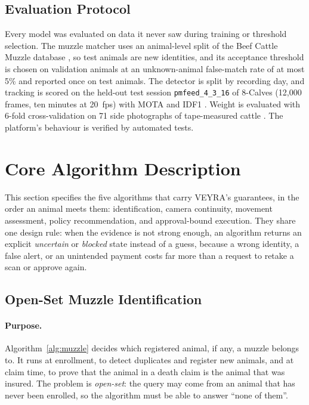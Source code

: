 \documentclass[11pt,letterpaper]{article}
\begin{document}
\subsection{Evaluation Protocol}

Every model was evaluated on data it never saw during training or threshold selection. The muzzle matcher uses an animal-level split of the Beef Cattle Muzzle database \cite{li2022muzzle}, so test animals are new identities, and its acceptance threshold is chosen on validation animals at an unknown-animal false-match rate of at most 5\% and reported once on test animals. The detector is split by recording day, and tracking is scored on the held-out test session \texttt{pmfeed\_4\_3\_16} of 8-Calves (12{,}000 frames, ten minutes at 20~fps) with MOTA \cite{bernardin2008mota} and IDF1 \cite{ristani2016idf1}. Weight is evaluated with 6-fold cross-validation on 71 side photographs of tape-measured cattle \cite{mendeley_r11}. The platform's behaviour is verified by automated tests.

\section{Core Algorithm Description}

This section specifies the five algorithms that carry VEYRA's guarantees, in the order an animal meets them: identification, camera continuity, movement assessment, policy recommendation, and approval-bound execution. They share one design rule: when the evidence is not strong enough, an algorithm returns an explicit \emph{uncertain} or \emph{blocked} state instead of a guess, because a wrong identity, a false alert, or an unintended payment costs far more than a request to retake a scan or approve again.

\subsection{Open-Set Muzzle Identification}

\paragraph{Purpose.} Algorithm~\ref{alg:muzzle} decides which registered animal, if any, a muzzle belongs to. It runs at enrollment, to detect duplicates and register new animals, and at claim time, to prove that the animal in a death claim is the animal that was insured. The problem is \emph{open-set}: the query may come from an animal that has never been enrolled, so the algorithm must be able to answer ``none of them''.
\end{document}
